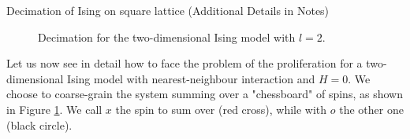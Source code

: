 \documentclass[../../Main/Main.tex]{subfiles}
\begin{document}
\begin{example}{Decimation of Ising on square lattice (Additional Details in Notes)}{}
\begin{figure}[H]
\begin{minipage}[c]{0.5\linewidth}
\end{minipage}
\begin{minipage}[]{0.5\linewidth}
\centering
{}
\end{minipage}
\caption{\label{fig:20_7} Decimation for the two-dimensional Ising model with \( l=2 \).}
\end{figure}
  Let us now see in detail how to face the problem of the proliferation for a two-dimensional Ising model with nearest-neighbour interaction and \( H=0 \). We choose to coarse-grain the system summing over a "chessboard" of spins, as shown in Figure \ref{fig:20_7}. We call \( x \) the spin to sum over (red cross), while with \( o \) the other one (black circle).


\end{example}
\end{document}
